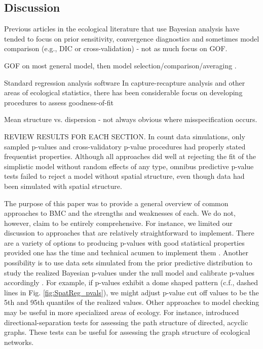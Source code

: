 \documentclass[12pt,english]{article}
\begin{document}
\begin{spacing}{1.9}
    

    \section{Discussion}


    Previous articles in the ecological literature that use Bayesian
    analysis have tended to focus on prior sensitivity, convergence
    diagnostics and sometimes model comparison (e.g., DIC or
    cross-validation) - not as much focus on GOF.

    GOF on most general model, then model
    selection/comparison/averaging \citep{BurnhamAnderson2002}.

    Standard regression analysis software In capture-recapture
    analysis and other areas of ecological statistics, there has been
    considerable focus on developing procedures to assess
    goodness-of-fit \citep[e.g.,][]{ChoquetEtAl2009}

    Mean structure vs. dispersion - not always obvious where
    misspecification occurs.
    
    REVIEW RESULTS FOR EACH SECTION.  In count data simulations, only sampled p-values and cross-validatory p-value procedures had properly stated frequentist properties.  Although all approaches did well at rejecting the fit of the simplistic model without random effects of any type, omnibus predictive p-value tests failed to reject a model without spatial structure, even though data had been simulated with spatial structure.

    The purpose of this paper was to provide a general overview of
    common approaches to BMC and the strengths and
    weaknesses of each.  We do not, however, claim to be entirely
    comprehensive. For instance, we limited our discussion to
    approaches that are relatively straightforward to implement.
    There are a variety of options to producing p-values with good
    statistical properties provided one has the time and technical
    acumen to implement them \citep[e.g., ``partial posterior" and
    ``conditional predictive" p-values;
    see][]{BayarriBerger1999,RobinsEtAl2000,BayarriCastellanos2007}. Another
    possibility is to use data sets simulated from the prior
    predictive distribution to study the realized Bayesian p-values
    under the null model and calibrate p-values accordingly
    \citep{HjortEtAl2006}.  For example, if p-values exhibit a dome
    shaped pattern (c.f., dashed lines in
    Fig. \ref{fig:SpatReg_pvals}), we might adjust p-value cut off
    values to be the 5th and 95th quantiles of the realized values.
    Other approaches to model checking may be useful in more
    specialized areas of ecology.  For instance, \citet{Shipley2009}
    introduced directional-separation tests for assessing the path
    structure of directed, acyclic graphs.  These tests can be useful
    for assessing the graph structure of ecological networks.



\end{spacing}
\end{document}

